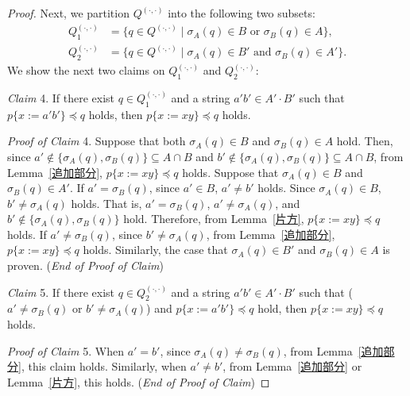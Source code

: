 \begin{proof}
Next, we partition $Q^{(\cdot,\cdot)}$ into the following two subsets:
\begin{align*}
  Q_{1}^{(\cdot,\cdot)} & = \{q \in Q^{(\cdot,\cdot)} \mid \sigma_{A}(q) \in B \mbox{ or } \sigma_{B}(q) \in A\},\\
  Q_{2}^{(\cdot,\cdot)} & = \{q \in Q^{(\cdot,\cdot)} \mid \sigma_{A}(q) \in B' \mbox{ and } \sigma_{B}(q) \in A'\}.
\end{align*}
We show the next two claims on $Q_{1}^{(\cdot,\cdot)}$ and $Q_{2}^{(\cdot,\cdot)}$:

\smallskip

\noindent
\textit{Claim} 4.
If there exist $q \in Q_{1}^{(\cdot,\cdot)}$ and a string $a'b' \in A'\cdot B'$ such that $p\{x:=a'b'\} \preceq q$ holds, then $p\{x:=xy\} \preceq q$ holds.

\smallskip

\noindent
\textit{Proof of Claim} 4.
Suppose that both $\sigma_{A}(q) \in B$ and $\sigma_{B}(q) \in A$ hold. Then, since $a' \not\in \{\sigma_{A}(q), \sigma_{B}(q)\} \subseteq A\cap B$ and $b' \not\in \{\sigma_{A}(q), \sigma_{B}(q)\} \subseteq A\cap B$, from Lemma~\ref{追加部分}, $p\{x:=xy\} \preceq q$ holds.
Suppose that $\sigma_{A}(q)\in B$ and $\sigma_{B}(q)\in A'$.
If $a' = \sigma_{B}(q)$, since $a' \in B$, $a' \not= b'$ holds.
Since $\sigma_{A}(q)\in B$, $b' \not= \sigma_{A}(q)$ holds.
That is, $a' = \sigma_{B}(q)$, $a' \not= \sigma_{A}(q)$, and $b' \not\in \{\sigma_{A}(q), \sigma_{B}(q)\}$ hold.
Therefore, from Lemma~\ref{片方}, $p\{x:=xy\} \preceq q$ holds.
If $a' \not= \sigma_{B}(q)$, since $b' \not= \sigma_{A}(q)$, from Lemma~\ref{追加部分}, $p\{x:=xy\} \preceq q$ holds.
Similarly, the case that $\sigma_{A}(q)\in B'$ and $\sigma_{B}(q)\in A$ is proven. (\textit{End of Proof of Claim})

\smallskip

\noindent
\textit{Claim} 5.
If there exist $q \in Q_{2}^{(\cdot,\cdot)}$ and a string $a'b' \in A'\cdot B'$ such that ($a' \not= \sigma_{B}(q)$ or $b' \not= \sigma_{A}(q)$) and $p\{x:=a'b'\} \preceq q$ hold, then $p\{x:=xy\} \preceq q$ holds.
 
\smallskip

\noindent
\textit{Proof of Claim} 5.
When $a'=b'$, since $\sigma_{A}(q) \not= \sigma_{B}(q)$, from Lemma~\ref{追加部分}, this claim holds. Similarly, when $a' \not = b'$, from Lemma~\ref{追加部分} or Lemma~\ref{片方}, this holds.  (\textit{End of Proof of Claim})
  
\smallskip


\end{proof}
